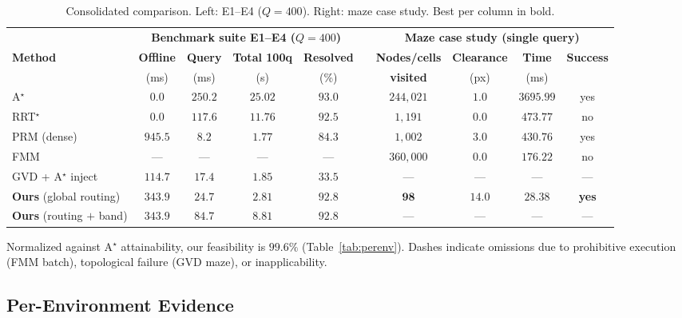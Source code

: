 \documentclass[conference]{IEEEtran}
\begin{document}
\begin{table}[htbp]
\caption{Consolidated comparison. Left: E1--E4 ($Q=400$). Right: maze case study. Best per column in bold.}
\label{tab:master}
\begin{center}
\begin{tabular}{@{}l cccc c cccc@{}}
\toprule
& \multicolumn{4}{c}{\textbf{Benchmark suite E1--E4 ($Q=400$)}} & & \multicolumn{4}{c}{\textbf{Maze case study (single query)}} \\
\cmidrule(lr){2-5} \cmidrule(lr){7-10}
\textbf{Method} & \textbf{Offline} & \textbf{Query} & \textbf{Total 100q} & \textbf{Resolved} & & \textbf{Nodes/cells} & \textbf{Clearance} & \textbf{Time} & \textbf{Success} \\
 & (ms) & (ms) & (s) & (\%) & & \textbf{visited} & (px) & (ms) & \\ \midrule
A$^\star$~\cite{hart1968}              & $\mathbf{0.0}$ & $250.2$ & $25.02$ & $\mathbf{93.0}$ & & $244{,}021$ & $1.0$ & $3695.99$ & yes \\
RRT$^\star$~\cite{karaman2011}         & $\mathbf{0.0}$ & $117.6$ & $11.76$ & $92.5$ & & $1{,}191$ & $0.0$ & $473.77$ & no \\
PRM (dense)~\cite{kavraki1996}         & $945.5$ & $\mathbf{8.2}$ & $1.77$ & $84.3$ & & $1{,}002$ & $3.0$ & $430.76$ & yes \\
FMM                                    & --- & --- & --- & --- & & $360{,}000$ & $0.0$ & $176.22$ & no \\
GVD + A$^\star$ inject                 & $114.7$ & $17.4$ & $1.85$ & $33.5$ & & --- & --- & --- & --- \\ \midrule
\textbf{Ours} (global routing)         & $343.9$ & $24.7$ & $\mathbf{2.81}$ & $92.8$ & & $\mathbf{98}$ & $\mathbf{14.0}$ & $\mathbf{28.38}$ & \textbf{yes} \\
\textbf{Ours} (routing $+$ band)       & $343.9$ & $84.7$ & $8.81$ & $92.8$ & & --- & --- & --- & --- \\ \bottomrule
\end{tabular}
\end{center}
\footnotesize Normalized against A$^\star$ attainability, our feasibility is $99.6\%$ (Table~\ref{tab:perenv}). Dashes indicate omissions due to prohibitive execution (FMM batch), topological failure (GVD maze), or inapplicability.
\end{table}

\subsection{Per-Environment Evidence}
\end{document}
